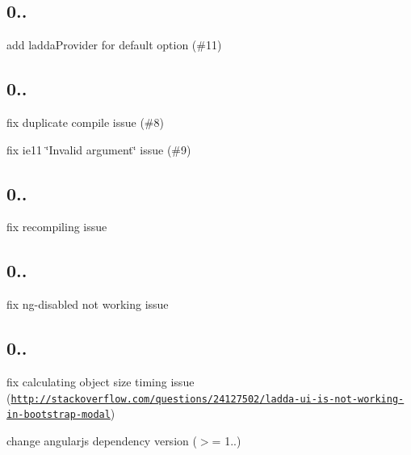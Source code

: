 \subsection*{0..}


\begin{DoxyItemize}
\item add ladda\+Provider for default option (\#11)
\end{DoxyItemize}

\subsection*{0..}


\begin{DoxyItemize}
\item fix duplicate compile issue (\#8)
\item fix ie11 \char`\"{}\+Invalid argument\char`\"{} issue (\#9)
\end{DoxyItemize}

\subsection*{0..}


\begin{DoxyItemize}
\item fix recompiling issue
\end{DoxyItemize}

\subsection*{0..}


\begin{DoxyItemize}
\item fix ng-\/disabled not working issue
\end{DoxyItemize}

\subsection*{0..}


\begin{DoxyItemize}
\item fix calculating object size timing issue (\href{http://stackoverflow.com/questions/24127502/ladda-ui-is-not-working-in-bootstrap-modal}{\tt http\+://stackoverflow.\+com/questions/24127502/ladda-\/ui-\/is-\/not-\/working-\/in-\/bootstrap-\/modal})
\item change angularjs dependency version ($>$= 1..) 
\end{DoxyItemize}